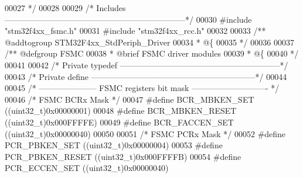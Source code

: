 \begin{DoxyCode}
00027 \textcolor{comment}{  */}
00028 
00029 \textcolor{comment}{/* Includes ------------------------------------------------------------------*/}
00030 \textcolor{preprocessor}{#}\textcolor{preprocessor}{include} "stm32f4xx_fsmc.h"
00031 \textcolor{preprocessor}{#}\textcolor{preprocessor}{include} "stm32f4xx_rcc.h"
00032 
00033 \textcolor{comment}{/** @addtogroup STM32F4xx\_StdPeriph\_Driver}
00034 \textcolor{comment}{  * @\{}
00035 \textcolor{comment}{  */}
00036 
00037 \textcolor{comment}{/** @defgroup FSMC }
00038 \textcolor{comment}{  * @brief FSMC driver modules}
00039 \textcolor{comment}{  * @\{}
00040 \textcolor{comment}{  */}
00041 
00042 \textcolor{comment}{/* Private typedef -----------------------------------------------------------*/}
00043 \textcolor{comment}{/* Private define ------------------------------------------------------------*/}
00044 
00045 \textcolor{comment}{/* --------------------- FSMC registers bit mask ---------------------------- */}
00046 \textcolor{comment}{/* FSMC BCRx Mask */}
00047 \textcolor{preprocessor}{#}\textcolor{preprocessor}{define} \textcolor{preprocessor}{BCR\_MBKEN\_SET}          \textcolor{preprocessor}{(}\textcolor{preprocessor}{(}\textcolor{preprocessor}{uint32\_t}\textcolor{preprocessor}{)}0x00000001\textcolor{preprocessor}{)}
00048 \textcolor{preprocessor}{#}\textcolor{preprocessor}{define} \textcolor{preprocessor}{BCR\_MBKEN\_RESET}        \textcolor{preprocessor}{(}\textcolor{preprocessor}{(}\textcolor{preprocessor}{uint32\_t}\textcolor{preprocessor}{)}0x000FFFFE\textcolor{preprocessor}{)}
00049 \textcolor{preprocessor}{#}\textcolor{preprocessor}{define} \textcolor{preprocessor}{BCR\_FACCEN\_SET}         \textcolor{preprocessor}{(}\textcolor{preprocessor}{(}\textcolor{preprocessor}{uint32\_t}\textcolor{preprocessor}{)}0x00000040\textcolor{preprocessor}{)}
00050 
00051 \textcolor{comment}{/* FSMC PCRx Mask */}
00052 \textcolor{preprocessor}{#}\textcolor{preprocessor}{define} \textcolor{preprocessor}{PCR\_PBKEN\_SET}          \textcolor{preprocessor}{(}\textcolor{preprocessor}{(}\textcolor{preprocessor}{uint32\_t}\textcolor{preprocessor}{)}0x00000004\textcolor{preprocessor}{)}
00053 \textcolor{preprocessor}{#}\textcolor{preprocessor}{define} \textcolor{preprocessor}{PCR\_PBKEN\_RESET}        \textcolor{preprocessor}{(}\textcolor{preprocessor}{(}\textcolor{preprocessor}{uint32\_t}\textcolor{preprocessor}{)}0x000FFFFB\textcolor{preprocessor}{)}
00054 \textcolor{preprocessor}{#}\textcolor{preprocessor}{define} \textcolor{preprocessor}{PCR\_ECCEN\_SET}          \textcolor{preprocessor}{(}\textcolor{preprocessor}{(}\textcolor{preprocessor}{uint32\_t}\textcolor{preprocessor}{)}0x00000040\textcolor{preprocessor}{)}

\end{DoxyCode}
